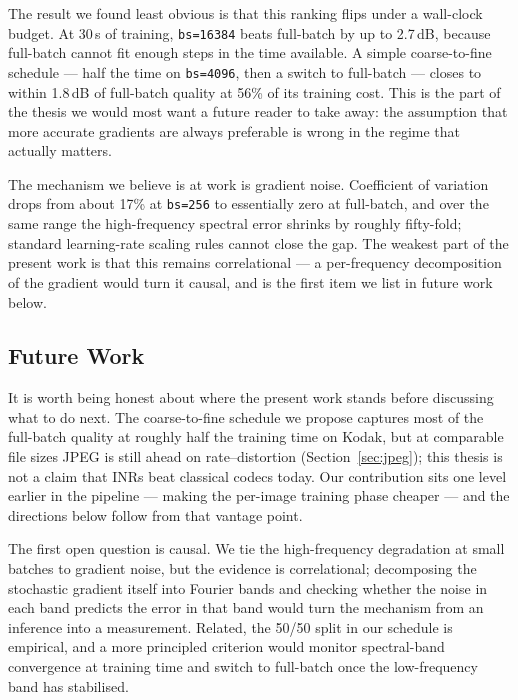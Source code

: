 \documentclass[a4paper,oneside,11pt,english]{scrartcl}
\begin{document}
The result we found least obvious is that this ranking flips under a
wall-clock budget.  At 30\,s of training, \texttt{bs=16384} beats
full-batch by up to 2.7\,dB, because full-batch cannot fit enough steps
in the time available.  A simple coarse-to-fine schedule --- half the
time on \texttt{bs=4096}, then a switch to full-batch --- closes to
within 1.8\,dB of full-batch quality at 56\% of its training cost.  This
is the part of the thesis we would most want a future reader to take
away: the assumption that more accurate gradients are always preferable
is wrong in the regime that actually matters.

The mechanism we believe is at work is gradient noise.  Coefficient of
variation drops from about 17\% at \texttt{bs=256} to essentially zero
at full-batch, and over the same range the high-frequency spectral
error shrinks by roughly fifty-fold; standard learning-rate scaling
rules cannot close the gap.  The weakest part of the present work is
that this remains correlational --- a per-frequency decomposition of
the gradient would turn it causal, and is the first item we list in
future work below.

\subsection{Future Work}

It is worth being honest about where the present work stands before
discussing what to do next.  The coarse-to-fine schedule we propose
captures most of the full-batch quality at roughly half the training
time on Kodak, but at comparable file sizes JPEG is still ahead on
rate--distortion (Section~\ref{sec:jpeg}); this thesis is not a claim
that INRs beat classical codecs today.  Our contribution sits one level
earlier in the pipeline --- making the per-image training phase
cheaper --- and the directions below follow from that vantage point.

The first open question is causal.  We tie the high-frequency
degradation at small batches to gradient noise, but the evidence is
correlational; decomposing the stochastic gradient itself into Fourier
bands and checking whether the noise in each band predicts the error in
that band would turn the mechanism from an inference into a measurement.
Related, the 50/50 split in our schedule is empirical, and a more
principled criterion would monitor spectral-band convergence at training
time and switch to full-batch once the low-frequency band has stabilised.
\end{document}
